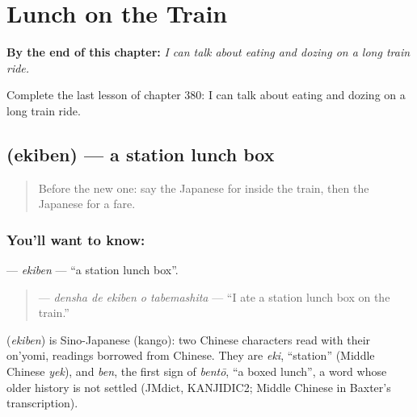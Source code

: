 
\chapter{Lunch on the Train}
\label{ch:ja-lunch-on-the-train}

\begin{chapteropening}
\textbf{By the end of this chapter:} \emph{I can talk about eating and dozing on a long train ride.}

Complete the last lesson of chapter 380: I can talk about eating and dozing on a long train ride.
\end{chapteropening}

\section[\texorpdfstring{\ja{えきべん} (ekiben)}{えきべん (ekiben)}]{ (ekiben) — a station lunch box}

\label{lesson:JA-C380-ekiben}



\begin{quote}
Before the new one: say the Japanese for inside the train, then the Japanese for a fare.
\end{quote}

\subsection*{You'll want to know: }
\textbf{} — \emph{ekiben} — \textquotedblleft{}a station lunch box\textquotedblright{}.

\begin{quote}
\textbf{  } — \emph{densha de ekiben o tabemashita} — \textquotedblleft{}I ate a station lunch box on the train.\textquotedblright{}
\end{quote}

\begin{cousinweb}
\textbf{} (\emph{ekiben}) is Sino-Japanese (kango): two Chinese characters read with their on'yomi, readings borrowed from Chinese. They are \emph{eki}, \textquotedblleft{}station\textquotedblright{} (Middle Chinese \emph{yek}), and \emph{ben}, the first sign of \emph{bentō}, \textquotedblleft{}a boxed lunch\textquotedblright{}, a word whose older history is not settled (JMdict, KANJIDIC2; Middle Chinese in Baxter's transcription).
\end{cousinweb}

